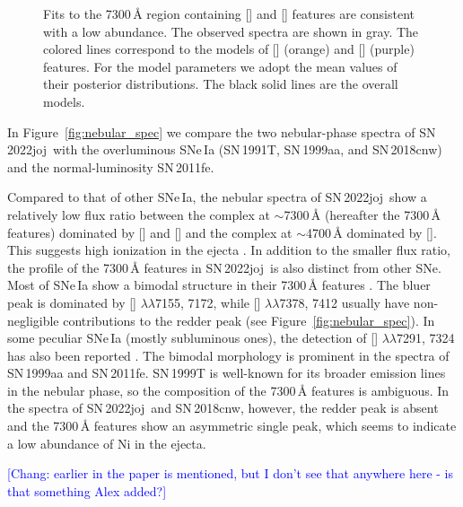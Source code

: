 \documentclass[twocolumn]{aastex631}
\newcommand{\sn}{SN\,2022joj}
\newcommand{\chang}[1]{\textcolor{blue}{[Chang: #1]}}
\begin{document}
\begin{CJK*}{UTF8}{gbsn}
\begin{figure}
    \caption{Fits to the 7300\,\r{A} region containing [] and [] features are consistent with a low  abundance. The observed spectra are shown in gray. The colored lines correspond to the models of [] (orange) and [] (purple) features. For the model parameters we adopt the mean values of their posterior distributions. The black solid lines are the overall models.}
    \label{fig:Fe_ni}
\end{figure}

In Figure~\ref{fig:nebular_spec} we compare the two nebular-phase spectra of \sn\ with the overluminous SNe\,Ia (SN\,1991T, SN\,1999aa, and SN\,2018cnw) and the normal-luminosity SN\,2011fe.

Compared to that of other SNe\,Ia, the nebular spectra of \sn\ show a relatively low flux ratio between the complex at $\sim$7300\,\r{A} (hereafter the 7300\,\r{A} features) dominated by [] and [] and the complex at $\sim$4700\,\r{A} dominated by []. This suggests high ionization in the ejecta \citep{Wilk_2020}. In addition to the smaller flux ratio, the profile of the 7300\,\r{A} features in \sn\ is also distinct from other SNe. Most of SNe\,Ia show a bimodal structure in their 7300\,\r{A} features \citep[e.g.,][]{Graham_2017,Maguire_2018}. The bluer peak is dominated by [] $\lambda\lambda$7155, 7172, while [] $\lambda\lambda$7378, 7412 usually have non-negligible contributions to the redder peak (see Figure~\ref{fig:nebular_spec}). In some peculiar SNe\,Ia (mostly subluminous ones), the detection of [] $\lambda\lambda$7291, 7324 has also been reported \citep[e.g.][]{jacobson-galan_16hnk_2020,Siebert_19yvq_2020}. The bimodal morphology is prominent in the spectra of SN\,1999aa and SN\,2011fe. SN\,1999T is well-known for its broader emission lines in the nebular phase, so the composition of the 7300\,\r{A} features is ambiguous. In the spectra of \sn\ and SN\,2018cnw, however, the redder peak is absent and the 7300\,\r{A} features show an asymmetric single peak, which seems to indicate a low abundance of Ni in the ejecta.

\chang{earlier in the paper  is mentioned, but I don't see that anywhere here - is that something Alex added?}


\end{CJK*}
\end{document}
